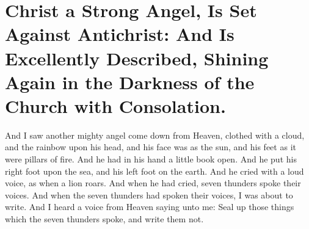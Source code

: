 \chapter[Sermon 43. Christ a Strong Angel, Is Set Against Antichrist: And Is Excellently Described, Shining Again in the Darkness of the Church with Consolation.]{Christ a Strong Angel, Is Set Against Antichrist: And Is Excellently Described, Shining Again in the Darkness of the Church with Consolation.}
\label{sermon:043}

And I saw another mighty angel come down from Heaven, clothed with a cloud, and the rainbow upon his head, and his face was as the sun, and his feet as it were pillars of fire. And he had in his hand a little book open. And he put his right foot upon the sea, and his left foot on the earth. And he cried with a loud voice, as when a lion roars. And when he had cried, seven thunders spoke their voices. And when the seven thunders had spoken their voices, I was about to write. And I heard a voice from Heaven saying unto me: Seal up those things which the seven thunders spoke, and write them not.


